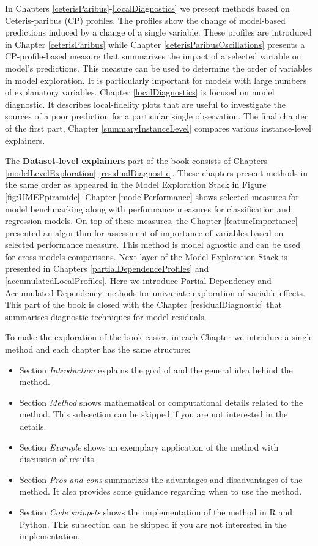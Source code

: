 \documentclass[12pt,]{krantz}
\providecommand{\tightlist}{%
  \setlength{\itemsep}{0pt}\setlength{\parskip}{0pt}}
\begin{document}
In Chapters \ref{ceterisParibus}-\ref{localDiagnostics} we present methods based on Ceteris-paribus (CP) profiles. The profiles show the change of model-based predictions induced by a change of a single variable. These profiles are introduced in Chapter \ref{ceterisParibus} while Chapter \ref{ceterisParibusOscillations} presents a CP-profile-based measure that summarizes the impact of a selected variable on model's predictions. This measure can be used to determine the order of variables in model exploration. It is particularly important for models with large numbers of explanatory variables. Chapter \ref{localDiagnostics} is focused on model diagnostic. It describes local-fidelity plots that are useful to investigate the sources of a poor prediction for a particular single observation.
The final chapter of the first part, Chapter \ref{summaryInstanceLevel} compares various instance-level explainers.

The \textbf{Dataset-level explainers} part of the book consists of Chapters \ref{modelLevelExploration}-\ref{residualDiagnostic}. These chapters present methods in the same order as appeared in the Model Exploration Stack in Figure \ref{fig:UMEPpiramide}.
Chapter \ref{modelPerformance} shows selected measures for model benchmarking along with performance measures for classification and regression models.
On top of these measures, the Chapter \ref{featureImportance} presented an algorithm for assessment of importance of variables based on selected performance measure. This method is model agnostic and can be used for cross models comparisons.
Next layer of the Model Exploration Stack is presented in Chapters \ref{partialDependenceProfiles} and \ref{accumulatedLocalProfiles}. Here we introduce Partial Dependency and Accumulated Dependency methods for univariate exploration of variable effects.
This part of the book is closed with the Chapter \ref{residualDiagnostic} that summarises diagnostic techniques for model residuals.

To make the exploration of the book easier, in each Chapter we introduce a single method and each chapter has the same structure:

\begin{itemize}
\tightlist
\item
  Section \emph{Introduction} explains the goal of and the general idea behind the method.
\item
  Section \emph{Method} shows mathematical or computational details related to the method. This subsection can be skipped if you are not interested in the details.
\item
  Section \emph{Example} shows an exemplary application of the method with discussion of results.
\item
  Section \emph{Pros and cons} summarizes the advantages and disadvantages of the method. It also provides some guidance regarding when to use the method.
\item
  Section \emph{Code snippets} shows the implementation of the method in R and Python. This subsection can be skipped if you are not interested in the implementation.
\end{itemize}
\end{document}
